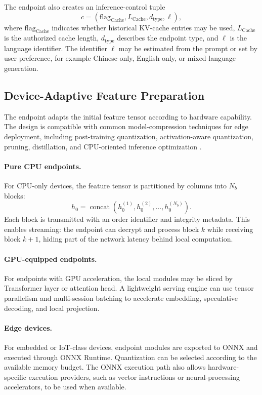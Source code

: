 \documentclass{article}
\newcommand{\Cache}{\mathrm{Cache}}
\newcommand{\concat}{\operatorname{concat}}
\begin{document}
The endpoint also creates an inference-control tuple
\begin{equation}
  c = (\mathrm{flag}_{\Cache}, L_{\Cache}, d_{\mathrm{type}}, \ell),
\end{equation}
where $\mathrm{flag}_{\Cache}$ indicates whether historical KV-cache entries may be used, $L_{\Cache}$ is the authorized cache length, $d_{\mathrm{type}}$ describes the endpoint type, and $\ell$ is the language identifier. The identifier $\ell$ may be estimated from the prompt or set by user preference, for example Chinese-only, English-only, or mixed-language generation.

\subsection{Device-Adaptive Feature Preparation}

The endpoint adapts the initial feature tensor according to hardware capability. The design is compatible with common model-compression techniques for edge deployment, including post-training quantization, activation-aware quantization, pruning, distillation, and CPU-oriented inference optimization \cite{frantar2023gptq,lin2024awq,xiao2023smoothquant,sun2024wanda,gu2024minillm,shen2025cpullm}.

\paragraph{Pure CPU endpoints.}
For CPU-only devices, the feature tensor is partitioned by columns into $N_b$ blocks:
\begin{equation}
  h_0 = \concat(h_0^{(1)}, h_0^{(2)}, \ldots, h_0^{(N_b)}).
\end{equation}
Each block is transmitted with an order identifier and integrity metadata. This enables streaming: the endpoint can decrypt and process block $k$ while receiving block $k+1$, hiding part of the network latency behind local computation.

\paragraph{GPU-equipped endpoints.}
For endpoints with GPU acceleration, the local modules may be sliced by Transformer layer or attention head. A lightweight serving engine can use tensor parallelism and multi-session batching to accelerate embedding, speculative decoding, and local projection.

\paragraph{Edge devices.}
For embedded or IoT-class devices, endpoint modules are exported to ONNX and executed through ONNX Runtime. Quantization can be selected according to the available memory budget. The ONNX execution path also allows hardware-specific execution providers, such as vector instructions or neural-processing accelerators, to be used when available.
\end{document}
